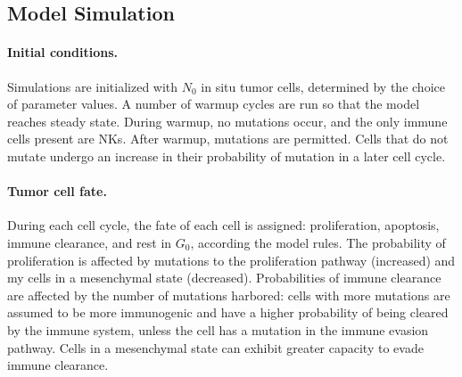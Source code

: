 \documentclass[11pt]{article}
\begin{document}
\subsection{Model Simulation}
\paragraph{Initial conditions.}
Simulations are initialized with $N_0$ in situ tumor cells, determined by the choice of parameter values. A number of warmup cycles are run so that the model reaches steady state.
During warmup, no mutations occur, and the only immune cells present are NKs.
After warmup, mutations are permitted. Cells that do not mutate undergo an increase in their probability of mutation in a later cell cycle.

\paragraph{Tumor cell fate.}
During each cell cycle, the fate of each cell is assigned: proliferation, apoptosis, immune clearance, and rest in $G_0$, according the model rules. The probability of proliferation is affected by mutations to the proliferation pathway (increased) and my cells in a mesenchymal state (decreased). Probabilities of immune clearance are affected by the number of mutations harbored: cells with more mutations are assumed to be more immunogenic and have a higher probability of being cleared by the immune system, unless the cell has a mutation in the immune evasion pathway. Cells in a mesenchymal state can exhibit greater capacity to evade immune clearance.
\end{document}
